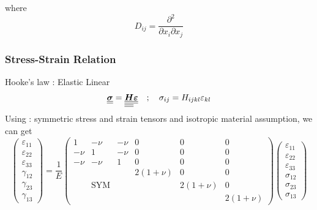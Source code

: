 \documentclass[12pt]{article}
\begin{document}
\noindent where 
\begin{equation}
    D_{ij} = \frac{\partial^2}{\partial x_i \partial x_j}
\end{equation}


\subsubsection{Stress-Strain Relation}
Hooke's law : Elastic Linear 
\begin{equation}
    \underline{\underline{\boldsymbol{\sigma}}} = \underline{\underline{\underline{\underline{\boldsymbol{H}}}}} \space \underline{\underline{\boldsymbol{\varepsilon}}}
    \quad ; \quad 
    \sigma_{ij} = H_{ijkl} \space \varepsilon_{kl}
    \label{eqn: SoM stress-strain}
\end{equation}
Using : symmetric stress and strain tensors and isotropic material assumption, we can get 
\begin{equation}
    \begin{pmatrix}
    \varepsilon_{11} \\
    \varepsilon_{22} \\
    \varepsilon_{33} \\
    \gamma_{12} \\
    \gamma_{23} \\
    \gamma_{13}
    \end{pmatrix}= \frac{1}{E}\begin{pmatrix}
    1 & - \nu & -\nu & 0 & 0 & 0 \\
    -\nu & 1 & -\nu & 0 & 0 & 0 \\
    -\nu & -\nu & 1 & 0 & 0 & 0 \\
     &  &  & 2(1+\nu) & 0 & 0 \\
     &  \text{SYM}&  &  & 2(1+\nu) & 0 \\
     &  &  &  &  & 2(1+\nu)
    \end{pmatrix}
    \begin{pmatrix}
    \varepsilon_{11} \\
    \varepsilon_{22} \\
    \varepsilon_{33} \\
    \sigma_{12} \\
    \sigma_{23} \\
    \sigma_{13}
    \end{pmatrix}
    \label{eqn: SoM simplified strain-stress, matrix form}
\end{equation}
\end{document}
